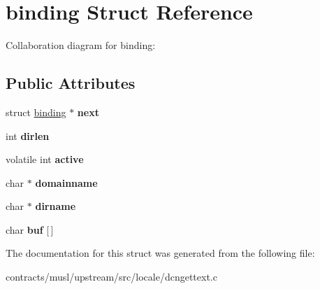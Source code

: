 \hypertarget{structbinding}{}\section{binding Struct Reference}
\label{structbinding}


Collaboration diagram for binding\+:
\subsection*{Public Attributes}
\begin{DoxyCompactItemize}
\item 
\mbox{\label{structbinding_adf6170cc867b4adaf962c44b804dd7d3}} 
struct \mbox{\hyperlink{structbinding}{binding}} $\ast$ {\bfseries next}
\item 
\mbox{\label{structbinding_a28f93e29532753775cec137a12464fdb}} 
int {\bfseries dirlen}
\item 
\mbox{\label{structbinding_aa8d0e2b05c07f43883fd859bd28bd33c}} 
volatile int {\bfseries active}
\item 
\mbox{\label{structbinding_a231ca19fc4bb3a6806179162f9160701}} 
char $\ast$ {\bfseries domainname}
\item 
\mbox{\label{structbinding_a9392e7b371a92e4e2cbafe27e886d35c}} 
char $\ast$ {\bfseries dirname}
\item 
\mbox{\label{structbinding_aaa20e5a51cee61b6b82e1ec62617b33d}} 
char {\bfseries buf} \mbox{[}$\,$\mbox{]}
\end{DoxyCompactItemize}


The documentation for this struct was generated from the following file\+:\begin{DoxyCompactItemize}
\item 
contracts/musl/upstream/src/locale/dcngettext.\+c\end{DoxyCompactItemize}

